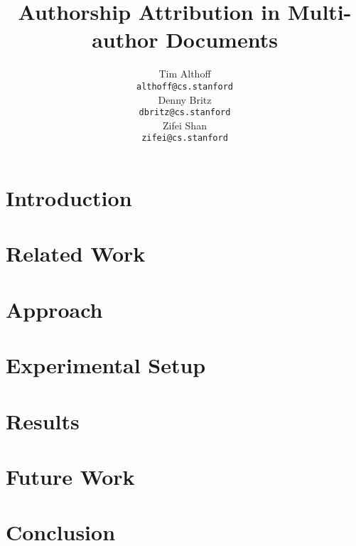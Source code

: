 \documentclass[11pt, oneside]{article}    %
\title{Authorship Attribution in Multi-author Documents}
\author{ Tim Althoff \\
  {\tt althoff@cs.stanford} \\\And
  Denny Britz \\
  {\tt dbritz@cs.stanford} \\\And
  Zifei Shan \\
  {\tt zifei@cs.stanford} \\
}
\begin{document}
\maketitle

\begin{abstract}



\end{abstract}

\section{Introduction}\label{sec:intro}


\section{Related Work}\label{sec:related_work}


\section{Approach}\label{sec:approach}


\section{Experimental Setup}\label{sec:experiments}


\section{Results}\label{sec:results}


\section{Future Work}\label{sec:future_work}


\section{Conclusion}\label{sec:conclusion}


\pagebreak %

\end{document}
